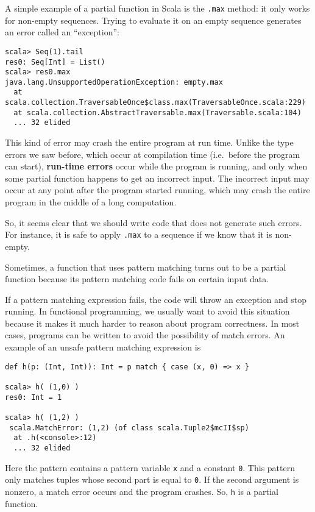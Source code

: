 A simple example of a partial function in Scala is the \lstinline!.max!
method: it only works for non-empty sequences. Trying to evaluate
it on an empty sequence generates an error called an ``exception'':
\begin{lstlisting}[mathescape=false]
scala> Seq(1).tail
res0: Seq[Int] = List()
scala> res0.max
java.lang.UnsupportedOperationException: empty.max
  at scala.collection.TraversableOnce$class.max(TraversableOnce.scala:229)
  at scala.collection.AbstractTraversable.max(Traversable.scala:104)
  ... 32 elided 
\end{lstlisting}
This kind of error may crash the entire program at run time. Unlike
the type errors we saw before, which occur at compilation
time (i.e.~before the program can start), \textbf{run-time errors}
occur while the program is running, and only when some partial function
happens to get an incorrect input. The incorrect input may occur at
any point after the program started running, which may crash the entire
program in the middle of a long computation.

So, it seems clear that we should write code that does not generate
such errors. For instance, it is safe to apply \lstinline!.max! to
a sequence if we know that it is non-empty.

Sometimes, a function that uses pattern matching turns out to be a
partial function because its pattern matching code fails on certain
input data. 

If a pattern matching expression fails, the code will throw an exception
and stop running. In functional programming, we usually want to avoid
this situation because it makes it much harder to reason about program
correctness. In most cases, programs can be written to avoid the possibility
of match errors. An example of an unsafe pattern matching expression
is
\begin{lstlisting}[mathescape=false]
def h(p: (Int, Int)): Int = p match { case (x, 0) => x }

scala> h( (1,0) )
res0: Int = 1

scala> h( (1,2) )
 scala.MatchError: (1,2) (of class scala.Tuple2$mcII$sp)
  at .h(<console>:12)
  ... 32 elided 
\end{lstlisting}
Here the pattern contains a pattern variable \lstinline!x! and a
constant \lstinline!0!. This pattern only matches tuples whose second
part is equal to \lstinline!0!. If the second argument is nonzero,
a match error occurs and the program crashes. So, \lstinline!h! is
a partial function.

